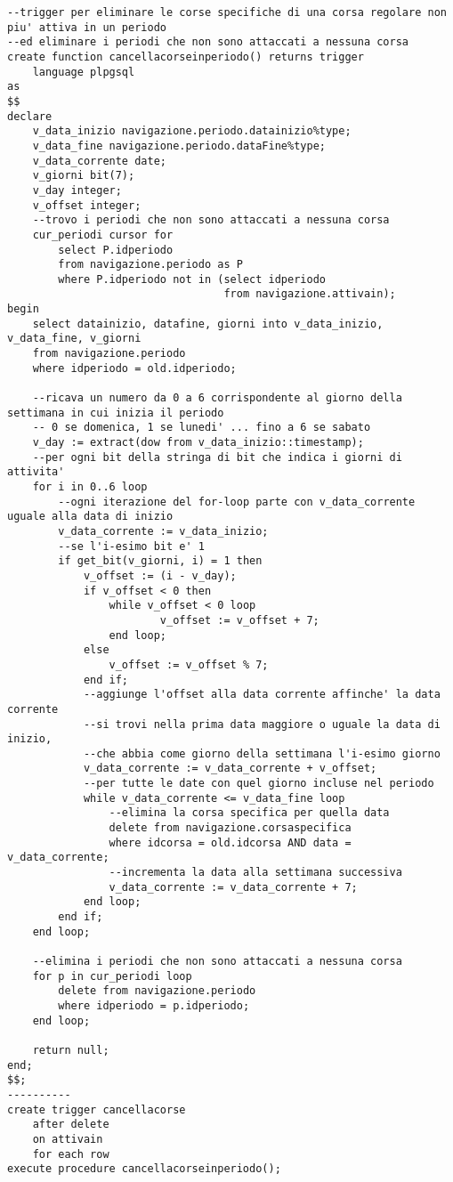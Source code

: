 \begin{lstlisting}[style=sqlstyle]
--trigger per eliminare le corse specifiche di una corsa regolare non piu' attiva in un periodo
--ed eliminare i periodi che non sono attaccati a nessuna corsa
create function cancellacorseinperiodo() returns trigger
    language plpgsql
as
$$
declare
    v_data_inizio navigazione.periodo.datainizio%type;
    v_data_fine navigazione.periodo.dataFine%type;
    v_data_corrente date;
    v_giorni bit(7);
    v_day integer;
    v_offset integer;
    --trovo i periodi che non sono attaccati a nessuna corsa
    cur_periodi cursor for
        select P.idperiodo
        from navigazione.periodo as P
        where P.idperiodo not in (select idperiodo 
                                  from navigazione.attivain);
begin
    select datainizio, datafine, giorni into v_data_inizio, v_data_fine, v_giorni
    from navigazione.periodo
    where idperiodo = old.idperiodo;

    --ricava un numero da 0 a 6 corrispondente al giorno della settimana in cui inizia il periodo
    -- 0 se domenica, 1 se lunedi' ... fino a 6 se sabato
    v_day := extract(dow from v_data_inizio::timestamp);
    --per ogni bit della stringa di bit che indica i giorni di attivita'
    for i in 0..6 loop
        --ogni iterazione del for-loop parte con v_data_corrente uguale alla data di inizio
        v_data_corrente := v_data_inizio;
        --se l'i-esimo bit e' 1
        if get_bit(v_giorni, i) = 1 then
            v_offset := (i - v_day);
            if v_offset < 0 then
                while v_offset < 0 loop
                        v_offset := v_offset + 7;
                end loop;
            else
                v_offset := v_offset % 7;
            end if;
            --aggiunge l'offset alla data corrente affinche' la data corrente
            --si trovi nella prima data maggiore o uguale la data di inizio,
            --che abbia come giorno della settimana l'i-esimo giorno
            v_data_corrente := v_data_corrente + v_offset;
            --per tutte le date con quel giorno incluse nel periodo
            while v_data_corrente <= v_data_fine loop
                --elimina la corsa specifica per quella data
                delete from navigazione.corsaspecifica
                where idcorsa = old.idcorsa AND data = v_data_corrente;
                --incrementa la data alla settimana successiva
                v_data_corrente := v_data_corrente + 7;
            end loop;
        end if;
    end loop;

    --elimina i periodi che non sono attaccati a nessuna corsa
    for p in cur_periodi loop
        delete from navigazione.periodo
        where idperiodo = p.idperiodo;
    end loop;
    
    return null;
end;
$$;
----------
create trigger cancellacorse
    after delete
    on attivain
    for each row
execute procedure cancellacorseinperiodo();

\end{lstlisting}

